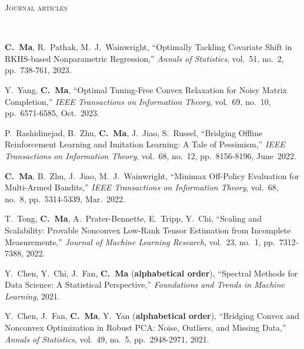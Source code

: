 \documentclass[a4paper, 10pt]{article}
\newenvironment{changemargin}[2]{%
  \begin{list}{}{%
    \setlength{\topsep}{0pt}%
    \setlength{\leftmargin}{#1}%
    \setlength{\rightmargin}{#2}%
    \setlength{\listparindent}{\parindent}%
    \setlength{\itemindent}{\parindent}%
    \setlength{\parsep}{\parskip}%
  }%
  \item[]}{\end{list}
}
\newcommand{\lineover}{
	\begin{changemargin}{-0.05in}{-0.05in}
		\vspace*{-8pt}
		\hrulefill \\
		\vspace*{-2pt}
	\end{changemargin}
}
\newcommand{\header}[1]{
	\begin{changemargin}{-0.5in}{-0.5in}
		\scshape{#1}\\
  	\lineover
	\end{changemargin}
}
\newenvironment{body} {
	\vspace*{-16pt}
	\begin{changemargin}{-0.3in}{-0.5in}
  }	
	{\end{changemargin}
}
\begin{document}
\bigskip
\header{\LARGE{Journal articles}}
\begin{body}
\vspace{18pt}
\begin{enumerate}[label={[{J}{{\arabic*}}]}]


\item \textbf{C.~Ma}, R.~Pathak, M.~J.~Wainwright, ``Optimally Tackling Covariate Shift in RKHS-based Nonparametric Regression,'' \emph{Annals of Statistics},  vol.~51, no.~2, pp.~738-761, 2023.

	
\item Y.~Yang, \textbf{C.~Ma}, {``Optimal Tuning-Free Convex Relaxation for Noisy Matrix Completion,''}  \emph{IEEE Transactions on Information Theory}, vol.~69, no.~10, pp.~6571-6585, Oct.~2023. \\

\item P.~Rashidinejad, B.~Zhu, \textbf{C.~Ma}, J.~Jiao, S.~Russel, {``Bridging Offline Reinforcement Learning and Imitation Learning: A Tale of Pessimism,''} \emph{IEEE Transactions on Information Theory},  vol.~68, no.~12, pp.~8156-8196, June~2022.

\item \textbf{C.~Ma}, B.~Zhu, J.~Jiao, M.~J.~Wainwright, {``Minimax Off-Policy Evaluation for Multi-Armed Bandits,''} \emph{IEEE Transactions on Information Theory}, vol.~68, no.~8, pp.~5314-5339, Mar.~2022. \\


\item T.~Tong, \textbf{C.~Ma}, A.~Prater-Bennette, E.~Tripp, Y.~Chi, {``Scaling and Scalability: Provable Nonconvex Low-Rank Tensor
Estimation from Incomplete Measurements,''} \emph{Journal of Machine Learning Research}, vol.~23, no.~1, pp.~7312-7388, 2022. \\



\item Y.~Chen, Y.~Chi, J.~Fan, \textbf{C.~Ma} (\textbf{alphabetical order}), {``Spectral Methods for Data Science: A Statistical Perspective,''}  \emph{Foundations and Trends in Machine Learning}, 2021. \\

\item Y.~Chen, J.~Fan, \textbf{C.~Ma}, Y.~Yan (\textbf{alphabetical order}), {``Bridging Convex and Nonconvex Optimization in Robust PCA: Noise, Outliers, and Missing Data,''}  \emph{Annals of Statistics}, vol.~49, no.~5, pp.~2948-2971, 2021. \\


\end{enumerate}
\end{body}
\end{document}
